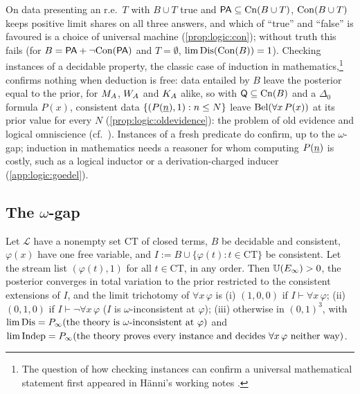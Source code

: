 On data presenting an r.e.\ $T$ with $B\cup T$ true and $\mathsf{PA}\subseteq\mathrm{Cn}(B\cup T)$, $\mathrm{Con}(B\cup T)$ keeps positive limit shares on all three answers, and which of ``true'' and ``false'' is favoured is a choice of universal machine (\cref{prop:logic:con}); without truth this fails (for $B=\mathsf{PA}+\neg\mathrm{Con}(\mathsf{PA})$ and $T=\emptyset$, $\lim\mathrm{Dis}(\mathrm{Con}(B))=1$). Checking instances of a decidable property, the classic case of induction in mathematics,\footnote{The question of how checking instances can confirm a universal mathematical statement first appeared in H\"anni's working notes \citep{hanni2026notes}.} confirms nothing when deduction is free: data entailed by $B$ leave the posterior equal to the prior, for $M_{A}$, $W_{A}$ and $K_{A}$ alike, so with $\mathsf{Q}\subseteq\mathrm{Cn}(B)$ and a $\Delta_0$ formula $P(x)$, consistent data $\{(P(\underline{n}),1):n\le N\}$ leave $\mathrm{Bel}(\forall x\,P(x))$ at its prior value for every $N$ (\cref{prop:logic:oldevidence}): the problem of old evidence and logical omniscience (cf.\ \citealp{hacking1967slightly,garber1983old}). Instances of a fresh predicate do confirm, up to the $\omega$-gap; induction in mathematics needs a reasoner for whom computing $P(\underline{n})$ is costly, such as a logical inductor \citep{garrabrant2016logical} or a derivation-charged inducer (\cref{app:logic:goedel}).

\subsection{The \texorpdfstring{$\omega$}{omega}-gap}\label{sec:logic:omega}

\begin{proposition}\label{prop:logic:omega}
Let $\mathcal L$ have a nonempty set $\mathrm{CT}$ of closed terms, $B$ be decidable and consistent, $\varphi(x)$ have one free variable, and $I:=B\cup\{\varphi(t):t\in\mathrm{CT}\}$ be consistent. Let the stream list $(\varphi(t),1)$ for all $t\in\mathrm{CT}$, in any order. Then $\mathbb{U}(E_\infty)>0$, the posterior converges in total variation to the prior restricted to the consistent extensions of $I$, and the limit trichotomy of $\forall x\,\varphi$ is
(i) $(1,0,0)$ if $I\vdash\forall x\,\varphi$;
(ii) $(0,1,0)$ if $I\vdash\neg\forall x\,\varphi$ ($I$ is $\omega$-inconsistent at $\varphi$);
(iii) otherwise in $(0,1)^3$, with $\lim\mathrm{Dis}=P_\infty(\text{the theory is $\omega$-inconsistent at }\varphi)$ and $\lim\mathrm{Indep}=P_\infty(\text{the theory proves every instance and decides }\forall x\,\varphi\text{ neither way})$.
\end{proposition}

